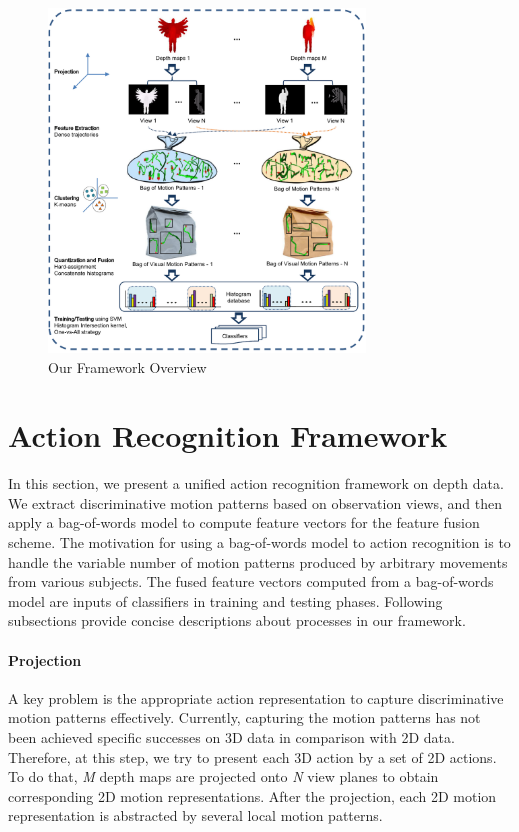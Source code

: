 \documentclass[final,3p,times,twocolumn]{elsarticle}
\begin{document}
\begin{figure}[ht]
	\centering
	\includegraphics[width=0.75\textwidth]{Figures/Framework3D.pdf} %
	\caption{Our Framework Overview}
	\label{Figure_FrameworkOverview}
\end{figure}

\section{Action Recognition Framework}
\label{Section_Framework}
In this section, we present a unified action recognition framework on depth data.
We extract discriminative motion patterns based on observation views, and then apply a bag-of-words model to compute feature vectors for the feature fusion scheme.
The motivation for using a bag-of-words model to action recognition is to handle the variable number of motion patterns produced by arbitrary movements from various subjects.
The fused feature vectors computed from a bag-of-words model are inputs of classifiers in training and testing phases.
Following subsections provide concise descriptions about processes in our framework.

\paragraph{\textbf{Projection}}
A key problem is the appropriate action representation to capture discriminative motion patterns effectively.
Currently, capturing the motion patterns has not been achieved specific successes on 3D data in comparison with 2D data.
Therefore, at this step, we try to present each 3D action by a set of 2D actions.
To do that, \textit{M} depth maps are projected onto \textit{N} view planes to obtain corresponding 2D motion representations.
After the projection, each 2D motion representation is abstracted by several local motion patterns.
\end{document}
